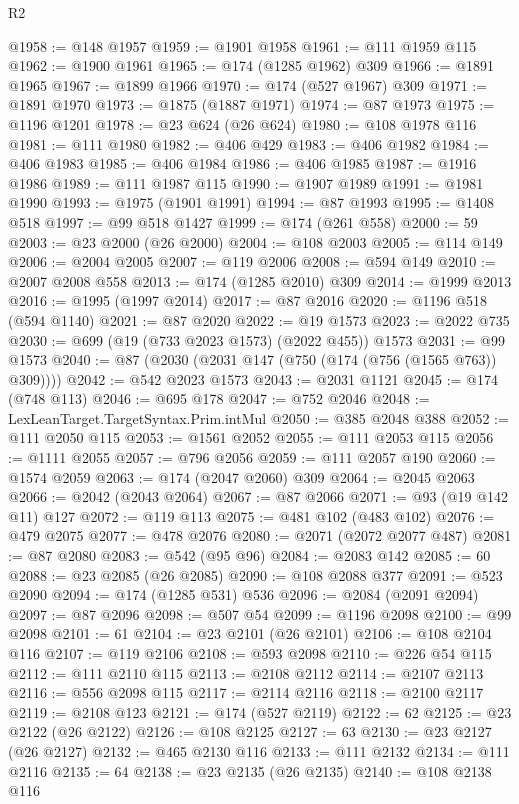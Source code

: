 \begin{lexlean}{R2}
\begin{coremodule}
@1958 := @148 @1957
@1959 := @1901 @1958
@1961 := @111 @1959 @115
@1962 := @1900 @1961
@1965 := @174 (@1285 @1962) @309
@1966 := @1891 @1965
@1967 := @1899 @1966
@1970 := @174 (@527 @1967) @309
@1971 := @1891 @1970
@1973 := @1875 (@1887 @1971)
@1974 := @87 @1973
@1975 := @1196 @1201
@1978 := @23 @624 (@26 @624)
@1980 := @108 @1978 @116
@1981 := @111 @1980
@1982 := @406 @429
@1983 := @406 @1982
@1984 := @406 @1983
@1985 := @406 @1984
@1986 := @406 @1985
@1987 := @1916 @1986
@1989 := @111 @1987 @115
@1990 := @1907 @1989
@1991 := @1981 @1990
@1993 := @1975 (@1901 @1991)
@1994 := @87 @1993
@1995 := @1408 @518
@1997 := @99 @518 @1427
@1999 := @174 (@261 @558)
@2000 := 59
@2003 := @23 @2000 (@26 @2000)
@2004 := @108 @2003
@2005 := @114 @149
@2006 := @2004 @2005
@2007 := @119 @2006
@2008 := @594 @149
@2010 := @2007 @2008 @558
@2013 := @174 (@1285 @2010) @309
@2014 := @1999 @2013
@2016 := @1995 (@1997 @2014)
@2017 := @87 @2016
@2020 := @1196 @518 (@594 @1140)
@2021 := @87 @2020
@2022 := @19 @1573
@2023 := @2022 @735
@2030 := @699 (@19 (@733 @2023 @1573) (@2022 @455)) @1573
@2031 := @99 @1573
@2040 := @87 (@2030 (@2031 @147 (@750 (@174 (@756 (@1565 @763)) @309))))
@2042 := @542 @2023 @1573
@2043 := @2031 @1121
@2045 := @174 (@748 @113)
@2046 := @695 @178
@2047 := @752 @2046
@2048 := LexLeanTarget.TargetSyntax.Prim.intMul
@2050 := @385 @2048 @388
@2052 := @111 @2050 @115
@2053 := @1561 @2052
@2055 := @111 @2053 @115
@2056 := @1111 @2055
@2057 := @796 @2056
@2059 := @111 @2057 @190
@2060 := @1574 @2059
@2063 := @174 (@2047 @2060) @309
@2064 := @2045 @2063
@2066 := @2042 (@2043 @2064)
@2067 := @87 @2066
@2071 := @93 (@19 @142 @11) @127
@2072 := @119 @113
@2075 := @481 @102 (@483 @102)
@2076 := @479 @2075
@2077 := @478 @2076
@2080 := @2071 (@2072 @2077 @487)
@2081 := @87 @2080
@2083 := @542 (@95 @96)
@2084 := @2083 @142
@2085 := 60
@2088 := @23 @2085 (@26 @2085)
@2090 := @108 @2088 @377
@2091 := @523 @2090
@2094 := @174 (@1285 @531) @536
@2096 := @2084 (@2091 @2094)
@2097 := @87 @2096
@2098 := @507 @54
@2099 := @1196 @2098
@2100 := @99 @2098
@2101 := 61
@2104 := @23 @2101 (@26 @2101)
@2106 := @108 @2104 @116
@2107 := @119 @2106
@2108 := @593 @2098
@2110 := @226 @54 @115
@2112 := @111 @2110 @115
@2113 := @2108 @2112
@2114 := @2107 @2113
@2116 := @556 @2098 @115
@2117 := @2114 @2116
@2118 := @2100 @2117
@2119 := @2108 @123
@2121 := @174 (@527 @2119)
@2122 := 62
@2125 := @23 @2122 (@26 @2122)
@2126 := @108 @2125
@2127 := 63
@2130 := @23 @2127 (@26 @2127)
@2132 := @465 @2130 @116
@2133 := @111 @2132
@2134 := @111 @2116
@2135 := 64
@2138 := @23 @2135 (@26 @2135)
@2140 := @108 @2138 @116

\end{coremodule}
\end{lexlean}
